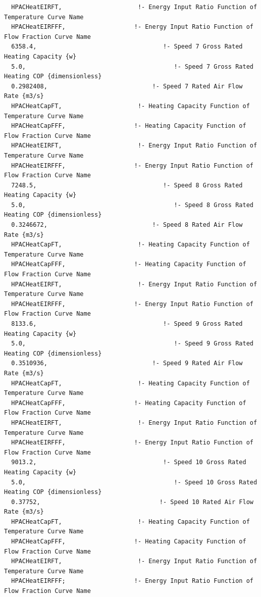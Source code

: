 \begin{lstlisting}
  HPACHeatEIRFT,                     !- Energy Input Ratio Function of Temperature Curve Name
  HPACHeatEIRFFF,                   !- Energy Input Ratio Function of Flow Fraction Curve Name
  6358.4,                                   !- Speed 7 Gross Rated Heating Capacity {w}
  5.0,                                         !- Speed 7 Gross Rated Heating COP {dimensionless}
  0.2982408,                             !- Speed 7 Rated Air Flow Rate {m3/s}
  HPACHeatCapFT,                     !- Heating Capacity Function of Temperature Curve Name
  HPACHeatCapFFF,                   !- Heating Capacity Function of Flow Fraction Curve Name
  HPACHeatEIRFT,                     !- Energy Input Ratio Function of Temperature Curve Name
  HPACHeatEIRFFF,                   !- Energy Input Ratio Function of Flow Fraction Curve Name
  7248.5,                                   !- Speed 8 Gross Rated Heating Capacity {w}
  5.0,                                         !- Speed 8 Gross Rated Heating COP {dimensionless}
  0.3246672,                             !- Speed 8 Rated Air Flow Rate {m3/s}
  HPACHeatCapFT,                     !- Heating Capacity Function of Temperature Curve Name
  HPACHeatCapFFF,                   !- Heating Capacity Function of Flow Fraction Curve Name
  HPACHeatEIRFT,                     !- Energy Input Ratio Function of Temperature Curve Name
  HPACHeatEIRFFF,                   !- Energy Input Ratio Function of Flow Fraction Curve Name
  8133.6,                                   !- Speed 9 Gross Rated Heating Capacity {w}
  5.0,                                         !- Speed 9 Gross Rated Heating COP {dimensionless}
  0.3510936,                             !- Speed 9 Rated Air Flow Rate {m3/s}
  HPACHeatCapFT,                     !- Heating Capacity Function of Temperature Curve Name
  HPACHeatCapFFF,                   !- Heating Capacity Function of Flow Fraction Curve Name
  HPACHeatEIRFT,                     !- Energy Input Ratio Function of Temperature Curve Name
  HPACHeatEIRFFF,                   !- Energy Input Ratio Function of Flow Fraction Curve Name
  9013.2,                                   !- Speed 10 Gross Rated Heating Capacity {w}
  5.0,                                         !- Speed 10 Gross Rated Heating COP {dimensionless}
  0.37752,                                 !- Speed 10 Rated Air Flow Rate {m3/s}
  HPACHeatCapFT,                     !- Heating Capacity Function of Temperature Curve Name
  HPACHeatCapFFF,                   !- Heating Capacity Function of Flow Fraction Curve Name
  HPACHeatEIRFT,                     !- Energy Input Ratio Function of Temperature Curve Name
  HPACHeatEIRFFF;                   !- Energy Input Ratio Function of Flow Fraction Curve Name
\end{lstlisting}


